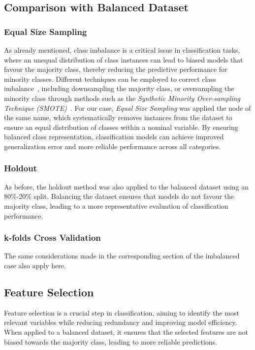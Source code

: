 \subsection{Comparison with Balanced Dataset}
\subsubsection{Equal Size Sampling}
As already mentioned, class imbalance is a critical issue in classification tasks, where an unequal distribution of class instances can lead to biased models that favour the majority class, thereby reducing the predictive performance for minority classes. Different techniques can be employed to correct class imbalance~\cite{imbalancedknime}, including downsampling the majority class, or oversampling the minority class through methods such as the \textit{Synthetic Minority Over-sampling Technique (SMOTE)}~\cite{imbalancedwiki}. For our case, \textit{Equal Size Sampling} was applied the node of the same name, which systematically removes instances from the dataset to ensure an equal distribution of classes within a nominal variable. By ensuring balanced class representation, classification models can achieve improved generalization error and more reliable performance across all categories.
\subsubsection{Holdout}
As before, the holdout method was also applied to the balanced dataset using an 80\%-20\% split. Balancing the dataset ensures that models do not favour the majority class, leading to a more representative evaluation of classification performance.
\subsubsection{k-folds Cross Validation}
The same considerations made in the corresponding section of the imbalanced case also apply here.
\subsection{Feature Selection}%
Feature selection is a crucial step in classification, aiming to identify the most relevant variables while reducing redundancy and improving model efficiency. When applied to a balanced dataset, it ensures that the selected features are not biased towards the majority class, leading to more reliable predictions. 


